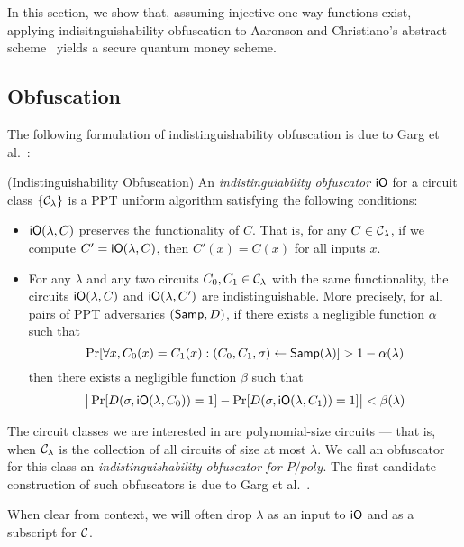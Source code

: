 \label{sec:qmoney}

In this section, we show that, assuming injective one-way functions exist, applying indisitnguishability obfuscation to Aaronson and Christiano's abstract scheme~\cite{STOC:AarChr12} yields a secure quantum money scheme.  

\subsection{Obfuscation}

The following formulation of indistinguishability obfuscation is due to Garg et al.~\cite{FOCS:GGHRSW13}:

\begin{definition}(Indistinguishability Obfuscation) An \emph{indistinguiability obfuscator} ${\sf iO}$ for a circuit class $\{{\mathcal{C}}_\lambda\}$ is a PPT uniform algorithm satisfying the following conditions:
	\begin{itemize}
		\item ${\sf iO}(\lambda,C)$ preserves the functionality of $C$.  That is, for any $C\in{\mathcal{C}}_\lambda$, if we compute $C'={\sf iO}(\lambda,C)$, then $C'(x)=C(x)$ for all inputs $x$.
		\item For any $\lambda$ and any two circuits $C_0,C_1\in{\mathcal{C}}_\lambda$ with the same functionality, the circuits ${\sf iO}(\lambda,C)$ and ${\sf iO}(\lambda,C')$ are indistinguishable.  More precisely, for all pairs of PPT adversaries $({\sf Samp},D)$, if there exists a negligible function $\alpha$ such that
		\[ \Pr[\forall x, C_0(x)=C_1(x):(C_0,C_1,\sigma)\gets {\sf Samp}(\lambda)]>1-\alpha(\lambda) \]
		then there exists a negligible function $\beta$ such that
		\[  \big|\Pr[D(\sigma,{\sf iO}(\lambda,C_0))=1]-\Pr[D(\sigma,{\sf iO}(\lambda,C_1))=1]\big|<\beta(\lambda) \]
	\end{itemize}
\end{definition}

The circuit classes we are interested in are polynomial-size circuits  ---  that is, when ${\mathcal{C}}_\lambda$ is the collection of all circuits of size at most $\lambda$.  We call an obfuscator for this class an \emph{indistinguishability obfuscator for $P/poly$}.  The first candidate construction of such obfuscators is due to Garg et al.~\cite{FOCS:GGHRSW13}.

When clear from context, we will often drop $\lambda$ as an input to ${\sf iO}$ and as a subscript for ${\mathcal{C}}$.

